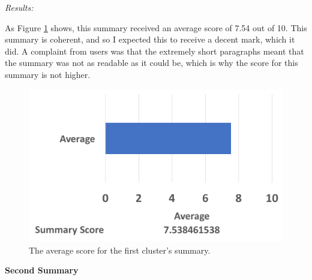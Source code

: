 \documentclass[12pt]{article}
\begin{document}
\emph{Results:}

As Figure \ref{summ1} shows, this summary received an average score of 7.54 out of 10. This summary is coherent, and so I expected this to receive a decent mark, which it did. A complaint from users was that the extremely short paragraphs meant that the summary was not as readable as it could be, which is why the score for this summary is not higher. \\

\begin{figure}[ht!]
  \centering
    \includegraphics[scale=0.6]{summ1score.png}
   \caption[The average score for a summary]{The average score for the first cluster's summary.}
   \label{summ1}
\end{figure} 

\textbf{Second Summary}
\end{document}
